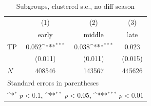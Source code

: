 \begin{table}[htbp]\centering
\def\sym#1{\ifmmode^{#1}\else\(^{#1}\)\fi}
\caption{Subgroups, clustered s.e.,  no diff season}
\begin{tabular}{l*{3}{c}}
\hline\hline
            &\multicolumn{1}{c}{(1)}&\multicolumn{1}{c}{(2)}&\multicolumn{1}{c}{(3)}\\
            &\multicolumn{1}{c}{early}&\multicolumn{1}{c}{middle}&\multicolumn{1}{c}{late}\\
\hline
TP          &       0.052\sym{***}&       0.038\sym{***}&       0.023         \\
            &     (0.011)         &     (0.011)         &     (0.015)         \\
\hline
\(N\)       &      408546         &      143567         &      445626         \\
\hline\hline
\multicolumn{4}{l}{\footnotesize Standard errors in parentheses}\\
\multicolumn{4}{l}{\footnotesize \sym{*} \(p<0.1\), \sym{**} \(p<0.05\), \sym{***} \(p<0.01\)}\\
\end{tabular}
\end{table}
